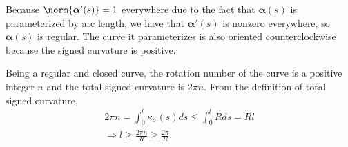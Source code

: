 \documentclass[a4paper,12pt]{article}
\newcommand{\bs}{\boldsymbol}
\theoremstyle{remark}
\begin{document}
\begin{enumerate}
        Because $\norm{\bs{\alpha}'(s)} = 1$ everywhere due to the fact that $\bs{\alpha}(s)$ is parameterized by arc length, we have that $\bs{\alpha}'(s)$ is nonzero everywhere, so $\bs{\alpha}(s)$ is regular. The curve it parameterizes is also oriented counterclockwise because the signed curvature is positive. \par
        Being a regular and closed curve, the rotation number of the curve is a positive integer $n$ and the total signed curvature is $2\pi n$. From the definition of total signed curvature,
        \begin{gather*}
            2\pi n = \int_0^l \kappa_\sigma(s)ds \leq \int_0^l Rds = Rl \\
            \Rightarrow l \geq \frac{2\pi n}{R} \geq \frac{2\pi}{R}.
        \end{gather*}
\end{enumerate}
\end{document}
